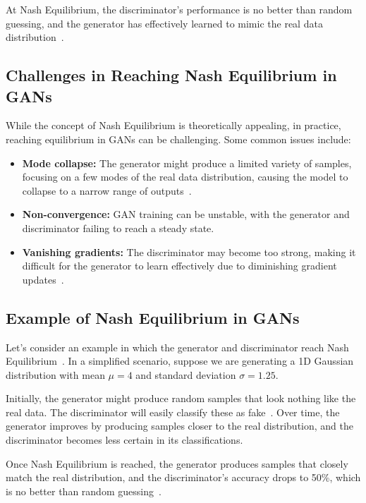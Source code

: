 At Nash Equilibrium, the discriminator's performance is no better than random guessing, and the generator has effectively learned to mimic the real data distribution~\cite{farnia2020gans}.

\subsection{Challenges in Reaching Nash Equilibrium in GANs}
While the concept of Nash Equilibrium is theoretically appealing, in practice, reaching equilibrium in GANs can be challenging. Some common issues include:

\begin{itemize}
    \item \textbf{Mode collapse:} The generator might produce a limited variety of samples, focusing on a few modes of the real data distribution, causing the model to collapse to a narrow range of outputs~\cite{he2018probgan}.
    \item \textbf{Non-convergence:} GAN training can be unstable, with the generator and discriminator failing to reach a steady state.
    \item \textbf{Vanishing gradients:} The discriminator may become too strong, making it difficult for the generator to learn effectively due to diminishing gradient updates~\cite{farnia2020gans}.
\end{itemize}

\subsection{Example of Nash Equilibrium in GANs}
Let's consider an example in which the generator and discriminator reach Nash Equilibrium~\cite{kazeminia2020gans}. In a simplified scenario, suppose we are generating a 1D Gaussian distribution with mean \( \mu = 4 \) and standard deviation \( \sigma = 1.25 \).

Initially, the generator might produce random samples that look nothing like the real data. The discriminator will easily classify these as fake~\cite{goodfellow2014generative, farnia2020gans}. Over time, the generator improves by producing samples closer to the real distribution, and the discriminator becomes less certain in its classifications.

Once Nash Equilibrium is reached, the generator produces samples that closely match the real distribution, and the discriminator's accuracy drops to 50\%, which is no better than random guessing~\cite{farnia2020gans}.

